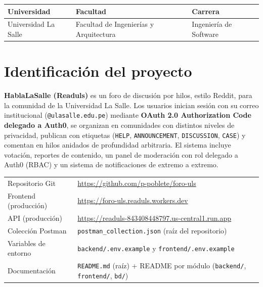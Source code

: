 \documentclass{article}
\newcommand{\itemUniversity}{Universidad La Salle}
\newcommand{\itemFaculty}{Facultad de Ingenierías y Arquitectura}
\newcommand{\repoUrl}{https://github.com/p-poblete/foro-uls}
\newcommand{\frontUrl}{https://foro-uls.readuls.workers.dev}
\newcommand{\apiUrl}{https://readuls-843408448797.us-central1.run.app}
\begin{document}
\begin{table}[H]
    \begin{tabular}{|x{4.7cm}|x{4.8cm}|x{4.8cm}|}
        \hline
        \color{white}\textbf{Universidad} & \color{white}\textbf{Facultad}  & \color{white}\textbf{Carrera}   \\
        \hline
        \itemUniversity & \small\itemFaculty & Ingeniería de Software  \\
        \hline
    \end{tabular}
\end{table}

\clearpage
\tableofcontents
\clearpage

\section{Identificación del proyecto}

\textbf{HablaLaSalle (Readuls)} es un foro de discusión por hilos, estilo
Reddit, para la comunidad de la Universidad La Salle. Los usuarios inician
sesión con su correo institucional (\texttt{@ulasalle.edu.pe}) mediante
\textbf{OAuth 2.0 Authorization Code delegado a Auth0}, se organizan en
comunidades con distintos niveles de privacidad, publican con etiquetas
(\texttt{HELP}, \texttt{ANNOUNCEMENT}, \texttt{DISCUSSION}, \texttt{CASE}) y
comentan en hilos anidados de profundidad arbitraria. El sistema incluye
votación, reportes de contenido, un panel de moderación con rol delegado a
Auth0 (RBAC) y un sistema de notificaciones de extremo a extremo.

\begin{table}[H]
\setlength{\tabcolsep}{0.5em}
{\renewcommand{\arraystretch}{1.35}
\begin{tabular}{|p{4.2cm}|p{10.3cm}|}
    \hline
    \rowcolor{tablebackground}
    \multicolumn{2}{|l|}{\color{white}\textbf{Accesos del proyecto}} \\
    \hline
    Repositorio Git & \url{\repoUrl} \\
    \hline
    Frontend (producción) & \url{\frontUrl} \\
    \hline
    API (producción) & \url{\apiUrl} \\
    \hline
    Colección Postman & \texttt{postman\_collection.json} (raíz del repositorio) \\
    \hline
    Variables de entorno & \texttt{backend/.env.example} y \texttt{frontend/.env.example} \\
    \hline
    Documentación & \texttt{README.md} (raíz) + README por módulo (\texttt{backend/}, \texttt{frontend/}, \texttt{bd/}) \\
    \hline
\end{tabular}}
\end{table}
\end{document}

